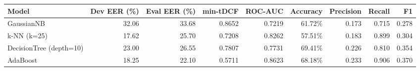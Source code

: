 \begin{tabular}{lrrrrrrrr}
\toprule
Model & Dev EER (\%) & Eval EER (\%) & min-tDCF & ROC-AUC & Accuracy & Precision & Recall & F1 \\
\midrule
GaussianNB & 32.06 & 33.68 & 0.8652 & 0.7219 & 61.72\% & 0.173 & 0.715 & 0.278 \\
k-NN (k=25) & 17.62 & 25.70 & 0.7208 & 0.8262 & 57.51\% & 0.183 & 0.899 & 0.304 \\
DecisionTree (depth=10) & 23.00 & 26.55 & 0.7807 & 0.7731 & 69.41\% & 0.226 & 0.810 & 0.354 \\
AdaBoost & 18.25 & 22.10 & 0.5711 & 0.8623 & 68.18\% & 0.233 & 0.906 & 0.370 \\
\bottomrule
\end{tabular}

